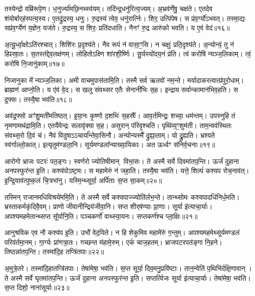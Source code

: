 तस्येन्द्रो वम्रि॑रूपे॒ण। ध॒नुर्ज्या॑मछि॒नथ्स्व॑यम्। 
तदि॑न्द्र॒धनु॑\-रित्य॒ज्यम्। अ॒भ्रव॑र्णेषु॒ चक्ष॑ते। 
एतदेव शंयोर्बार्‌ह॑स्पत्य॒स्य। ए॒तद्रु॑द्रस्य॒ धनुः। 
रु॒द्रस्य॑ त्वेव॒ धनु॑रार्त्निः। शिर॒ उत्पि॑पेष। 
स प्र॑व॒र्ग्यो॑ऽभवत्। तस्मा॒द्यः सप्र॑व॒र्ग्येण॑ य॒ज्ञेन॒ यज॑ते। 
रु॒द्रस्य॒ स शिरः॒ प्रति॑दधाति। नैनꣳ॑ रु॒द्र आरु॑को भवति। य ए॒वं वेद॑॥१६॥\anuvakamend


अ॒त्यू॒र्ध्वा॒क्षोऽति॑रश्चात्। शिशि॑रः प्र॒दृश्य॑ते। 
नैव रूपं न॑ वासा॒ꣳ॒सि। न चक्षुः॑ प्रति॒दृश्य॑ते। 
अ॒न्योन्यं॒ तु न॑ हिꣴस्रा॒तः। स॒तस्त॑द्देव॒लक्ष॑णम्। 
लोहितोऽक्ष्णि शा॑रशी॒र्ष्णिः। सू॒र्यस्यो॑दय॒नं प्र॑ति। 
त्वं करोषि॑ न्यञ्ज॒लिकाम्। त्वं॒ करो॑षि नि॒जानु॑काम्॥१७॥

निजानुका मे᳚ न्यञ्ज॒लिका। अमी वाचमुपास॑तामि॒ति। 
तस्मै सर्व ऋतवो॑ नम॒न्ते। मर्यादाकरत्वात्प्र॑\-पुरो॒धाम्। 
ब्राह्मण॑ आप्नो॒ति। य ए॑वं वे॒द। स खलु संवथ्सर एतैः सेनानी॑भिः स॒ह। 
इन्द्राय सर्वान्कामान॑भिव॒हति। स द्र॒फ्सः। तस्यै॒षा भव॑ति॥१८॥

अव॑द्र॒फ्सो अꣳ॑शु॒मती॑मतिष्ठत्। इ॒या॒नः कृ॒ष्णो द॒शभिः॑ स॒हस्रैः᳚। 
आव॒र्तमिन्द्रः॒ शच्या॒ धम॑न्तम्। उपस्नुहि तं नृमणामथ॑द्रामि॒ति। 
एतयैवेन्द्रः सलावृ॑क्या स॒ह। असुरान्‌ प॑रिवृ॒श्चति। 
पृथि॑व्य॒ꣳ॒शुम॑ती। ताम॒न्वव॑स्थितः संवथ्स॒रो दि॒वं च॑। 
नैवं विदुषाऽऽचार्या᳚न्तेवा॒सिनौ। अन्योन्यस्मै᳚ द्रुह्या॒ताम्। यो द्रु॒ह्यति। 
भ्रश्यते स्व॑र्गाल्लो॒कात्। इत्यृतुम॑ण्डला॒नि। 
सूर्यमण्डला᳚न्या\-ख्या॒यिकाः। अत ऊर्ध्वꣳ स॑निर्व॒चनाः॥१९॥\anuvakamend


आरोगो भ्राजः पटरः॑ पत॒ङ्गः। स्वर्णरो ज्योतिषीमान् विभा॒सः। 
ते अस्मै सर्वे दिवमा॑तप॒न्ति। ऊर्जं दुहाना अनपस्फुर॑न्त इ॒ति। 
कश्य॑पोऽष्ट॒मः। स महामेरुं न॑ जहा॒ति। 
तस्यै॒षा भव॑ति। यत्ते॒ शिल्पं॑ कश्यप रोच॒नाव॑त्। 
इ॒न्द्रि॒याव॑त्पुष्क॒लं चि॒त्रभा॑नु। यस्मि॒न्थ्सूर्या॒ अर्पि॑ताः स॒प्त सा॒कम्॥२०॥

तस्मिन्‌ राजानमधिविश्रये॑ममि॒ति। ते अस्मै सर्वे कश्यपाज्ज्यो\-ति॑र्लभ॒न्ते। 
तान्थ्सोमः कश्यपादधि॑निर्ध॒मति। भ्रस्ताकर्मकृ॑दिवै॒वम्। 
प्राणो जीवानीन्द्रिय॑जीवा॒नि। सप्त शीर्‌ष॑ण्याः प्रा॒णाः। 
सूर्या इ॑त्याचा॒र्याः। अपश्यमहमेतान्थ्सप्त सू᳚र्यानि॒ति। 
पञ्च\-कर्णो॑ वाथ्स्या॒यनः। सप्तकर्ण॑श्च प्ला॒क्षिः॥२१॥

आनुश्रविक एव नौ कश्य॑प इ॒ति। उभौ॑ वेद॒यिते। 
न हि शेकुमिव महामे॑रुं ग॒न्तुम्। अपश्यमहमेथ्सूर्यमण्डलं परिव॑र्तमा॒नम्। 
गा॒र्ग्यः प्रा॑णत्रा॒तः। गच्छन्त म॑हामे॒रुम्। एकं॑ चाज॒हतम्। 
भ्राजपटरपत॑ङ्गा नि॒हने। तिष्ठन्ना॑तप॒न्ति। तस्मा॑दि॒ह तप्त्रि॑तपाः॥२२॥

अ॒मुत्रे॒तरे। तस्मा॑दि॒हातप्त्रि॑तपाः। तेषा॑मेषा॒ भव॑ति। 
स॒प्त सूर्या॒ दिव॒मनु॒प्रवि॑ष्टाः। तान॒न्वेति॑ प॒थिभि॑र्दक्षि॒णावान्। 
ते अस्मै सर्वे घृतमा॑तप॒न्ति। ऊर्जं दुहाना अनपस्फुर॑न्त इ॒ति। 
सप्तर्त्विजः सूर्या इ॑त्याचा॒र्याः। तेषा॑मेषा॒ भव॑ति। स॒प्त दिशो॒ नाना॑सूर्याः॥२३॥

